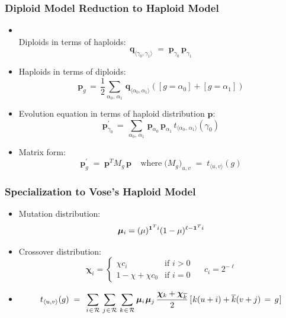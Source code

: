 \documentclass[aspectratio=169]{beamer}
\newcommand{\nudge}{\hspace{0.01in}}
\begin{document}
  \begin{frame}
    \frametitle{ Diploid Model Reduction to Haploid Model}
    {
    \begin{itemize}
      \item{ \mbox{}\\[0.1in]
      Diploids in terms of haploids:
      \[\bm{q}_{\langle \gamma_0, \gamma_1 \rangle}\; = \;
      \bm{p}_{\gamma_0} \, \bm{p}_{\gamma_1}\]}
      \item{Haploids in terms of diploids:
      \[ \bm{p}_g \, = \, \frac{1}{2} \sum_{\alpha_0, \, \alpha_1} \, \bm{q}_{\langle \alpha_0, \alpha_1 \rangle}
	    ([g = \alpha_0] + [g = \alpha_1]) \]}
      \item{Evolution equation in terms of haploid distribution $\bm{p}$:
      \[\bm{p}_{\gamma_0}^{\prime} \,=\, \sum_{\alpha_0, \, \alpha_1} \, \bm{p}_{\alpha_0} \, \bm{p}_{\alpha_1} \,
	  t_{\langle \alpha_0, \,\alpha_1 \rangle}(\gamma_0) \]}
      \item{Matrix form:
      \[ \bm{p}_g^\prime \; = \; \bm{p}^T M_g \, \bm{p} \;\;\;\; \text{where} \; \Big(M_g \Big)_{u,v} \; = \; t_{\langle u, v \rangle}(g) \]}
    \end{itemize}
    }
  \end{frame}
  
  \begin{frame}
    \frametitle{ Specialization to Vose's Haploid Model}
    \begin{itemize}
      \item{Mutation distribution: \[\bm{\mu}_i = (\mu)^{{\bf 1}^Ti} (1-\mu)^{\ell- {\bf 1}^Ti} \]}
      \item{Crossover distribution: \[
	\bm{\chi}_i =\begin{cases}
	  \chi c_i & \text{if $i>0$}\\
	  1 - \chi + \chi  c_0 & \text{if $i = 0$} \; 
	\end{cases}
	\quad c_i = 2^{-\ell}
      \]
      }      
      \item{\[ t_{\langle u,v \rangle}(g) \; = \;\,
      \sum_{i \nudge \in \nudge \mathcal{R}} \, \sum_{j \nudge \in \nudge \mathcal{R}} \,
      \sum_{k \nudge \in \nudge \mathcal{R}}
      \bm{\mu}_i \nudge \bm{\mu}_j \, \frac{\bm{\chi}_k + \bm{\chi}_{\overline{k}}}{2} \,
      [\nudge k (u + i) + \overline{k}(v + j) \, = \, g\nudge]  \] %
      
      }
    \end{itemize}
  \end{frame}
  
\end{document}
